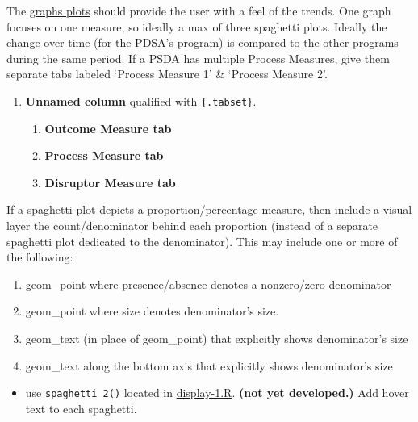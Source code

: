 \documentclass[
]{book}
\providecommand{\tightlist}{%
  \setlength{\itemsep}{0pt}\setlength{\parskip}{0pt}}
\begin{document}
The \href{https://ouhscbbmc.github.io/data-science-practices-1/dashboard-1.html\#graphs}{graphs plots} should provide the user with a feel of the trends. One graph focuses on one measure, so ideally a max of three spaghetti plots. Ideally the change over time (for the PDSA's program) is compared to the other programs during the same period. If a PSDA has multiple Process Measures, give them separate tabs labeled `Process Measure 1' \& `Process Measure 2'.

\begin{enumerate}
\def\labelenumi{\arabic{enumi}.}
\item
  \textbf{Unnamed column} qualified with \texttt{\{.tabset\}}.

  \begin{enumerate}
  \def\labelenumii{\arabic{enumii}.}
  \tightlist
  \item
    \textbf{Outcome Measure tab}
  \item
    \textbf{Process Measure tab}
  \item
    \textbf{Disruptor Measure tab}
  \end{enumerate}
\end{enumerate}

If a spaghetti plot depicts a proportion/percentage measure, then include a visual layer the count/denominator behind each proportion (instead of a separate spaghetti plot dedicated to the denominator). This may include one or more of the following:

\begin{enumerate}
\def\labelenumi{\arabic{enumi}.}
\tightlist
\item
  geom\_point where presence/absence denotes a nonzero/zero denominator
\item
  geom\_point where size denotes denominator's size.
\item
  geom\_text (in place of geom\_point) that explicitly shows denominator's size
\item
  geom\_text along the bottom axis that explicitly shows denominator's size
\end{enumerate}

\begin{itemize}
\tightlist
\item
  use \texttt{spaghetti\_2()} located in \href{https://github.com/OuhscBbmc/miechv-3/blob/master/analysis/common/display-1.R}{display-1.R}. \textbf{(not yet developed.)} Add hover text to each spaghetti.
\end{itemize}
\end{document}
